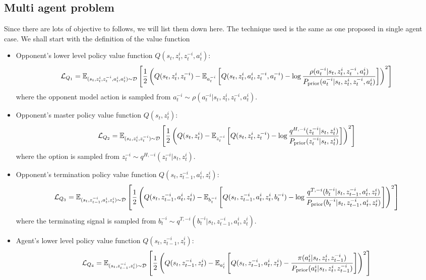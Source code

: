 \subsection{Multi agent problem}
Since there are lots of objective to follows, we will list them down here. The technique used is the same as one proposed in single agent case. We shall start with the definition of the value function 
\begin{itemize}
    \item Opponent's lower level policy value function $Q(s_t, z^i_t, z^{-i}_t, a^i_t)$:
    \begin{equation}
        \mathcal{L}_{Q_1} = \mathbb{E}_{(s_t, z^i_t, z^{-i}_t, a^i_t, a^i_t) \sim \mathcal{D}}\left[ \frac{1}{2}\left( Q(s_t, z^i_t, z^{-i}_t) - \mathbb{E}_{a^{-i}_t}\left[ Q(s_t, z^i_t, a^i_t, z^{-i}_t, a^{-i}_t) - \log\frac{ \rho(a^{-i}_t | s_t, z^i_t, z^{-i}_t, a^i_t)}{P_{\text{prior}}(a^{-i}_t | s_t, z^i_t, z^{-i}_t, a^i_t)} \right] \right)^2 \right]
    \end{equation}
    where the opponent model action is sampled from $a^{-i}_t \sim \rho(a^{-i}_t | s_t, z^i_t, z^{-i}_t, a^i_t)$.
    \item Opponent's master policy value function $Q(s_t, z^i_t)$:
    \begin{equation}
        \mathcal{L}_{Q_2} = \mathbb{E}_{(s_t, z^i_t, z^{-i}_t) \sim \mathcal{D}}\left[ \frac{1}{2}\left( Q(s_t, z^i_t) - \mathbb{E}_{z^{-i}_t}\left[ Q(s_t, z^i_t, z^{-i}_t) - \log\frac{q^{H, -i}(z^{-i}_t | s_t, z^i_t)}{P_{\text{prior}}(z^{-i}_t | s_t, z^i_t)} \right] \right)^2 \right]
    \end{equation}
    where the option is sampled from $z^{-i}_t \sim q^{H, -i}(z^{-i}_t | s_t, z^i_t)$.
    \item Opponent's termination policy value function $Q(s_t, z^{-i}_{t-1}, a^i_t, z^i_t)$:
    \begin{equation}
        \mathcal{L}_{Q_3} = \mathbb{E}_{(s_t, z^{-i}_{t-1}, a^i_t, z^i_t) \sim \mathcal{D}}\left[ \frac{1}{2}\left( Q(s_t, z^{-i}_{t-1}, a^i_t, z^i_t) - \mathbb{E}_{b^{-i}_t}\left[ Q(s_t,  z^{-i}_{t-1}, a^i_t, z^i_t, b^{-i}_t) - \log\frac{q^{T,-i}(b^{-i}_t | s_t,  z^{-i}_{t-1}, a^i_t, z^i_t) }{P_{\text{prior}}(b^{-i}_t | s_t,  z^{-i}_{t-1}, a^i_t, z^i_t) } \right] \right)^2 \right]
    \end{equation}
    where the terminating signal is sampled from $b^{-i}_t \sim q^{T,-i}(b^{-i}_t | s_t,  z^{-i}_{t-1}, a^i_t, z^i_t)$.
    \item Agent's lower level policy value function $Q(s_t,  z^{-i}_{t-1}, z^i_t)$:
    \begin{equation}
        \mathcal{L}_{Q_4} = \mseloss{(s_t,  z^{-i}_{t-1}, z^i_t) \sim \mathcal{D}}{Q(s_t,  z^{-i}_{t-1}, z^i_t)}{\mathbb{E}_{a^i_t}\brackb{Q(s_t,  z^{-i}_{t-1}, a^i_t, z^i_t)  - \frac{\pi(a^i_t | s_t, z^i_t, z^{-i}_{t-1})}{P_\prior(a^i_t | s_t, z^i_t, z^{-i}_{t-1})}}}

\end{equation}
\end{itemize}
